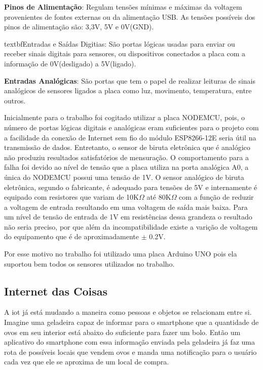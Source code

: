 \textbf{Pinos de Alimentação}: Regulam tensões mínimas e máximas da voltagem provenientes de fontes externas ou da alimentação USB. As tensões possíveis dos pinos de alimentação são: 3,3V, 5V e 0V(GND).

textbf{Entradas e Saídas Digitias}: São portas lógicas usadas para enviar ou receber sinais digitais para sensores, ou dispositivos conectados a placa com a informação de 0V(desligado) a 5V(ligado).

\textbf{Entradas Analógicas}: São portas que tem o papel de realizar leituras de sinais analógicos de sensores ligados a placa como luz, movimento, temperatura, entre outros.

Inicialmente para o trabalho foi cogitado utilizar a placa NODEMCU, pois, o número de portas lógicas digitais e analógicas eram suficientes para o projeto com a facilidade da conexão de Internet sem fio do módulo ESP8266-12E seria útil na transmissão de dados. Entretanto, o sensor de biruta eletrônica que é analógico não produziu resultados satisfatórios de mensuração. O comportamento para a falha foi devido ao nível de tensão que a placa utiliza na porta analógica A0, a única do NODEMCU possui uma tensão de 1V. O sensor analógico de biruta eletrônica, segundo o fabricante, é adequado para tensões de 5V e internamente é equipado com resistores que variam de 10K$\Omega$ até 80K$\Omega$ com a função de reduzir a voltagem de entrada resultando em uma voltagem de saída mais baixa. Para um nível de tensão de entrada de 1V em resistências dessa grandeza o resultado não seria preciso, por que além da incompatibilidade existe a varição de voltagem do equipamento que é de aproximadamente $\pm$ 0.2V.

Por esse motivo no trabalho foi utilizado uma placa Arduino UNO pois ela suportou bem todos os sensores utilizados no trabalho.


\subsection{Internet das Coisas}

A iot já está mudando a maneira como pessoas e objetos se relacionam entre si\cite{zmud2018primer}. Imagine uma geladeira capaz de informar para o smartphone que a quantidade de ovos em seu interior está abaixo do suficiente para fazer um bolo. Então um aplicativo do smartphone com essa informação enviada pela geladeira já faz uma rota de possíveis locais que vendem ovos e manda uma notificação para o usuário cada vez que ele se aproxima de um local de compra. 


